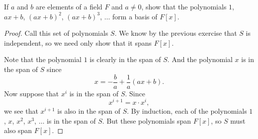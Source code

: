  If $a$ and $b$ are elements of a field $F$ and $a\neq0$,
show that the polynomials $1$, $ax+b$, $(ax+b)^2$, $(ax+b)^3$, $\dots$
form a basis of $F[x]$.
\begin{proof}
  Call this set of polynomials $S$. We know by the previous exercise
  that $S$ is independent, so we need only show that it spans
  $F[x]$.

  Note that the polynomial $1$ is clearly in the span of $S$. And the
  polynomial $x$ is in the span of $S$ since
  \begin{equation*}
    x = -\frac{b}a + \frac1a(ax+b).
  \end{equation*}
  Now suppose that $x^i$ is in the span of $S$. Since
  \begin{equation*}
    x^{i+1} = x\cdot x^i,
  \end{equation*}
  we see that $x^{i+1}$ is also in the span of $S$. By induction, each
  of the polynomials $1$, $x$, $x^2$, $x^3$, $\dots$ is in the span of
  $S$. But these polynomials span $F[x]$, so $S$ must also span
  $F[x]$.
\end{proof}

